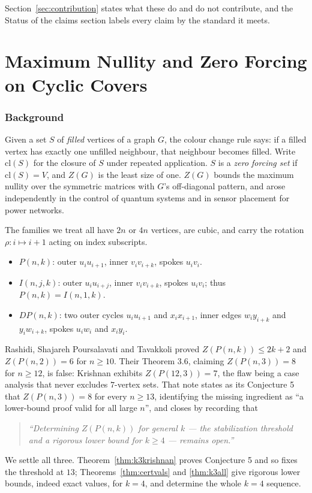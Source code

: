 \documentclass[11pt]{article}
\theoremstyle{definition}
\begin{document}
\medskip\noindent
Section~\ref{sec:contribution} states what these do and do not contribute, and
the Status of the claims section labels every claim by the standard it meets.



\part{Maximum Nullity and Zero Forcing on Cyclic Covers}
\label{part:zf}

\section{Background}
Given a set $S$ of \emph{filled} vertices of a graph $G$, the colour change
rule says: if a filled vertex has exactly one unfilled neighbour, that
neighbour becomes filled. Write $\mathrm{cl}(S)$ for the closure of $S$ under
repeated application. $S$ is a \emph{zero forcing set} if $\mathrm{cl}(S)=V$,
and $Z(G)$ is the least size of one. $Z(G)$ bounds the maximum nullity over
the symmetric matrices with $G$'s off-diagonal pattern, and arose
independently in the control of quantum systems and in sensor placement for
power networks.

The families we treat all have $2n$ or $4n$ vertices, are cubic, and carry the
rotation $\rho:i\mapsto i+1$ acting on index subscripts.

\begin{itemize}
\item $P(n,k)$: outer $u_iu_{i+1}$, inner $v_iv_{i+k}$, spokes $u_iv_i$.
\item $I(n,j,k)$: outer $u_iu_{i+j}$, inner $v_iv_{i+k}$, spokes $u_iv_i$;
      thus $P(n,k)=I(n,1,k)$.
\item $DP(n,k)$: two outer cycles $u_iu_{i+1}$ and $x_ix_{i+1}$, inner edges
      $w_iy_{i+k}$ and $y_iw_{i+k}$, spokes $u_iw_i$ and $x_iy_i$.
\end{itemize}

Rashidi, Shajareh Poursalavati and Tavakkoli \cite{RST} proved
$Z(P(n,k))\le2k+2$ and $Z(P(n,2))=6$ for $n\ge10$. Their Theorem 3.6, claiming
$Z(P(n,3))=8$ for $n\ge12$, is false: Krishnan \cite{K} exhibits
$Z(P(12,3))=7$, the flaw being a case analysis that never excludes $7$-vertex
sets. That note states as its Conjecture 5 that $Z(P(n,3))=8$ for every $n\ge13$,
identifying the missing ingredient as ``a lower-bound proof valid for all large
$n$'', and closes by recording that
\begin{quote}\itshape
``Determining $Z(P(n,k))$ for general $k$ --- the stabilization threshold and a
rigorous lower bound for $k\ge4$ --- remains open.''
\end{quote}
We settle all three. Theorem~\ref{thm:k3krishnan} proves Conjecture 5 and so
fixes the threshold at $13$; Theorems~\ref{thm:certvals} and \ref{thm:k3all}
give rigorous lower bounds, indeed exact values, for $k=4$, and determine the
whole $k=4$ sequence.
\end{document}
